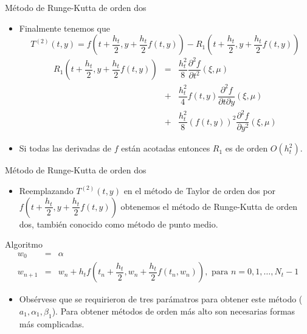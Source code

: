 \documentclass{beamer}
\begin{document}
\begin{frame}{Método de Runge-Kutta de orden dos}

{\small 
\begin{itemize}
\item Finalmente tenemos que
\begin{displaymath}
T^{(2)}(t, y) = f\left(t+\dfrac{h_t}{2},y+\dfrac{h_t}{2} f(t,y)\right) - R_1\left(t+\dfrac{h_t}{2},y+\dfrac{h_t}{2} f(t,y)\right)
\end{displaymath}
\begin{eqnarray*}
R_1\left(t+\dfrac{h_t}{2}, y+\dfrac{h_t}{2}f(t,y)\right) & = & 
\dfrac{h_t^2}{8}\dfrac{\partial^2 f}{\partial t^2} (\xi,\mu)  \\
& + & \dfrac{h_t^2}{4}f(t,y)\dfrac{\partial^2 f}{\partial t \partial y} (\xi,\mu) \\ 
& + & \dfrac{h_t^2}{8}(f(t,y))^2\dfrac{\partial^2 f}{\partial y^2} (\xi,\mu) 
\end{eqnarray*}
\item Si todas las derivadas de $f$ están acotadas entonces $R_1$ es de orden $O(h_t^2)$.
\end{itemize}
}
\end{frame}		

\begin{frame}{Método de Runge-Kutta de orden dos}

{\small 
	\begin{itemize}
	\item Reemplazando $T^{(2)}(t,y)$ en el método de Taylor de orden dos por $f\left(t+\dfrac{h_t}{2},y+\dfrac{h_t}{2} f(t,y)\right)$ obtenemos el método de Runge-Kutta de orden dos, también conocido como método de punto medio.
	\end{itemize}
\begin{block}{Algoritmo}
	\begin{eqnarray*}
		w_0 & = & \alpha \\
		w_{n+1} & = & w_n + h_t f\left(t_n+\dfrac{h_t}{2},w_n+\dfrac{h_t}{2} f(t_n,w_n)\right), 
		\text{ para } n = 0, 1, \dots, N_t-1
	\end{eqnarray*}
\end{block}
	\begin{itemize}
\item Obsérvese que se requirieron de tres parámatros para obtener este método ($a_1, \alpha_1, \beta_1$). Para obtener métodos de orden más alto son necesarias formas más complicadas.
	\end{itemize}
}
\end{frame}				
\end{document}
